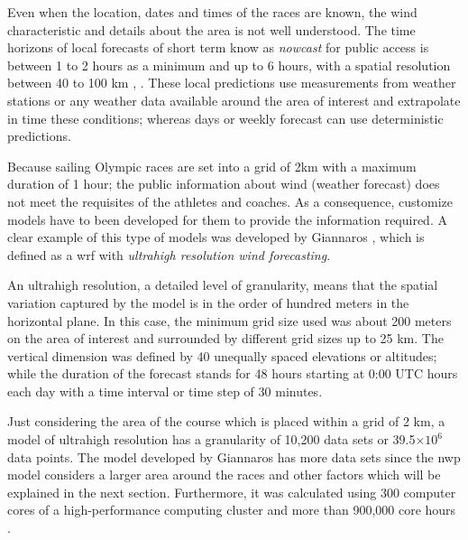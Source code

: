 Even when the location, dates and times of the races are known, the wind characteristic and details about the area is not well understood. The time horizons of local forecasts of short term know as \textit{nowcast} for public access is between 1 to 2 hours as a minimum and up to 6 hours, with a spatial resolution between 40 to 100 km \cite{warner2010numerical}, \cite{kristensen2010weather}. These local predictions use measurements from weather stations or any weather data available around the area of interest and extrapolate in time these conditions;
whereas days or weekly forecast can use deterministic predictions.\par
Because sailing Olympic races are set into a grid of 2km with a maximum duration of 1 hour; the public information about wind (weather forecast) does not meet the requisites of the athletes and coaches. As a consequence, customize models have to been developed for them to provide the information required. A clear example of this type of models was developed by Giannaros \cite{giannaros2018ultrahigh}, which is defined as a \acrshort{wrf} with \textit{ultrahigh resolution wind forecasting}.\par 
An ultrahigh resolution, a detailed level of granularity, means that the spatial variation captured by the model is in the order of hundred meters in the horizontal plane. In this case, the minimum grid size used was about 200 meters on the area of interest and surrounded by different grid sizes up to 25 km. The vertical dimension was defined by 40 unequally spaced elevations or altitudes; while the duration of the forecast stands for 48 hours starting at 0:00 UTC hours each day with a time interval or time step of 30 minutes. \par \noindent 
Just considering the area of the course which is placed within a grid of 2 km, a model of ultrahigh resolution has a granularity of 10,200 data sets or 39.5$\times 10^6$ data points. The model developed by Giannaros has more data sets since the \acrshort{nwp} model considers a larger area around the races and other factors which will be explained in the next section. Furthermore, it
was calculated using 300 computer cores of a high-performance computing cluster and more than 900,000 core hours \cite{giannaros2018ultrahigh}. 

